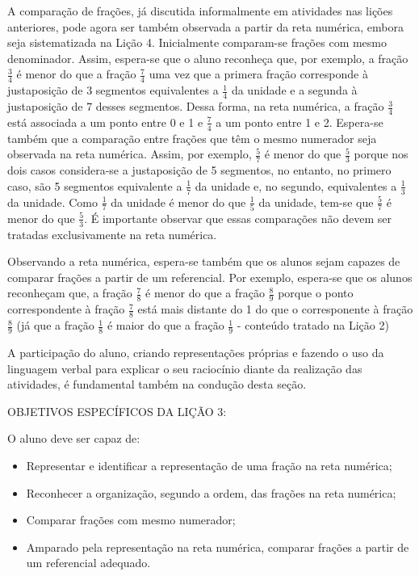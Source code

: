 A comparação de frações, já discutida informalmente em atividades nas lições anteriores, pode agora ser também observada a partir da reta numérica, embora seja sistematizada na Lição 4. Inicialmente comparam-se frações com mesmo denominador. Assim, espera-se que o aluno reconheça que, por exemplo, a fração $\frac{3}{4}$ é menor do que a fração $\frac{7}{4}$ uma vez que a primera fração corresponde à justaposição de 3 segmentos equivalentes a $\frac{1}{4}$ da unidade e a segunda à justaposição de 7 desses segmentos. Dessa forma, na reta numérica, a fração $\frac{3}{4}$ está associada a um ponto entre 0 e 1 e $\frac{7}{4}$ a um ponto entre 1 e 2. Espera-se também que a comparação entre frações que têm o mesmo numerador seja observada na reta numérica. Assim, por exemplo, $\frac{5}{7}$ é menor do que $\frac{5}{3}$ porque nos dois casos considera-se a justaposição de 5 segmentos, no entanto, no primero caso, são 5 segmentos equivalente a $\frac{1}{7}$ da unidade e, no segundo, equivalentes a $\frac{1}{3}$ da unidade. Como $\frac{1}{7}$ da unidade é menor do que $\frac{1}{5}$ da unidade, tem-se que $\frac{5}{7}$ é menor do que $\frac{5}{3}$.
É importante observar que essas comparações não devem ser tratadas exclusivamente na reta numérica. 

Observando a reta numérica, espera-se também que os alunos sejam capazes de comparar frações a partir de um referencial. Por exemplo, espera-se que os alunos reconheçam que, a fração $\frac{7}{8}$ é menor do que a fração $\frac{8}{9}$ porque o ponto correspondente à fração $\frac{7}{8}$ está mais distante do 1 do que o corresponente à fração $\frac{8}{9}$ (já que a fração $\frac{1}{8}$ é maior do que a fração $\frac{1}{9}$ - conteúdo tratado na Lição 2) 

A participação do aluno, criando representações próprias e fazendo o uso da linguagem verbal para explicar o seu raciocínio diante da realização das atividades, é fundamental também na condução desta seção.
\vspace{.15cm}

\noindent OBJETIVOS ESPECÍFICOS DA LIÇÃO 3:
\vspace{.15cm}

\noindent O aluno deve ser capaz de:
  \begin{itemize}
   \item Representar e identificar a representação de uma fração na reta numérica;
   \item Reconhecer a organização, segundo a ordem, das frações na reta numérica; 
   \item Comparar frações com mesmo numerador;
   \item Amparado pela representação na reta numérica, comparar frações a partir de um referencial adequado.
  \end{itemize}
 

